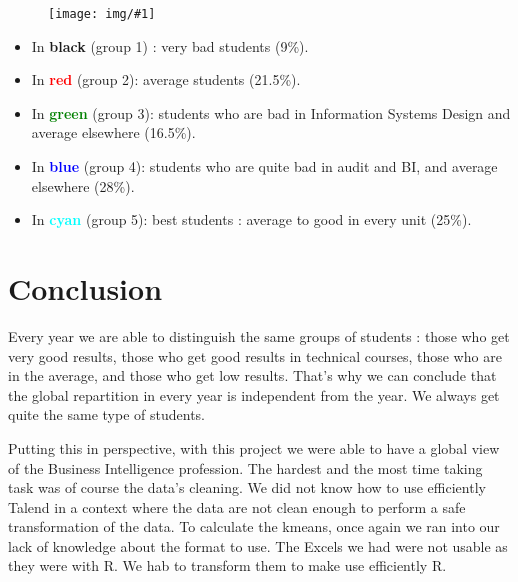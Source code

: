 \documentclass[11pt, a4paper]{article}
\newcommand\image[2]{
	\begin{figure}[H]
	\centering
	\texttt{[image: img/\#1]}
	\end{figure}
}
\begin{document}
    \image{M2-2008.png}{480px}
    
    \begin{multicols}{2}
        \begin{itemize}
            \item In \textbf{black} (group 1) : very bad students (9\%).
            \item In \textbf{\textcolor{red}{red}} (group 2): average students (21.5\%).
            \item In \textbf{\textcolor{green}{green}} (group 3): students who are bad in Information Systems Design and average elsewhere (16.5\%).
            \item In \textbf{\textcolor{blue}{blue}} (group 4): students who are quite bad in audit and BI, and average elsewhere (28\%).
            \item In \textbf{\textcolor{cyan}{cyan}} (group 5): best students : average to good in every unit (25\%).\\ 
        \end{itemize}
    \end{multicols}
    
    \newpage
    
    \section{Conclusion}
    
    Every year we are able to distinguish the same groups of students : those who get very good results, those who get good results in technical courses, those who are in the average, and those who get low results. That's why we can conclude that the global repartition in every year is independent from the year. We always get quite the same type of students.
    
    Putting this in perspective, with this project we were able to have a global view of the Business Intelligence profession. The hardest and the most time taking task was of course the data's cleaning. We did not know how to use efficiently Talend in a context where the data are not clean enough to perform a safe transformation of the data. To calculate the kmeans, once again we ran into our lack of knowledge about the format to use. The Excels we had were not usable as they were with R. We hab to transform them to make use efficiently R. 
\end{document}
